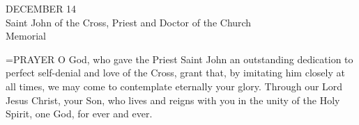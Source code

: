 \begin{center}\normalsize DECEMBER 14\\
\footnotesize Saint John of the Cross, Priest and Doctor of the Church\\
\footnotesize Memorial\\
\end{center}

\hangindent=\parindent \small{PRAYER 
O God, who gave the Priest Saint John
an outstanding dedication to perfect self-denial
and love of the Cross,
grant that, by imitating him closely at all times,
we may come to contemplate eternally your glory.
Through our Lord Jesus Christ, your Son,
who lives and reigns with you in the unity of the Holy Spirit,
one God, for ever and ever.\\}
 
